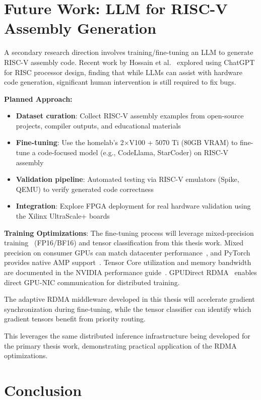 \documentclass[10pt,letterpaper]{article}
\begin{document}
\section{Future Work: LLM for RISC-V Assembly Generation}

A secondary research direction involves training/fine-tuning an LLM to generate RISC-V assembly code. Recent work by Hossain et al.~\cite{hossain2024} explored using ChatGPT for RISC processor design, finding that while LLMs can assist with hardware code generation, significant human intervention is still required to fix bugs.

\textbf{Planned Approach:}
\begin{itemize}[noitemsep]
    \item \textbf{Dataset curation}: Collect RISC-V assembly examples from open-source projects, compiler outputs, and educational materials
    \item \textbf{Fine-tuning}: Use the homelab's 2$\times$V100 + 5070 Ti (80GB VRAM) to fine-tune a code-focused model (e.g., CodeLlama, StarCoder) on RISC-V assembly
    \item \textbf{Validation pipeline}: Automated testing via RISC-V emulators (Spike, QEMU) to verify generated code correctness
    \item \textbf{Integration}: Explore FPGA deployment for real hardware validation using the Xilinx UltraScale+ boards
\end{itemize}

\textbf{Training Optimizations}: The fine-tuning process will leverage mixed-precision training~\cite{nvidia-amp} (FP16/BF16) and tensor classification from this thesis work. Mixed precision on consumer GPUs can match datacenter performance~\cite{mixed-prec-2080ti}, and PyTorch provides native AMP support~\cite{pytorch-fp16}. Tensor Core utilization and memory bandwidth are documented in the NVIDIA performance guide~\cite{nvidia-gpu-perf}. GPUDirect RDMA~\cite{gpudirect-docs} enables direct GPU-NIC communication for distributed training.

The adaptive RDMA middleware developed in this thesis will accelerate gradient synchronization during fine-tuning, while the tensor classifier can identify which gradient tensors benefit from priority routing.

This leverages the same distributed inference infrastructure being developed for the primary thesis work, demonstrating practical application of the RDMA optimizations.

\section{Conclusion}
\end{document}

